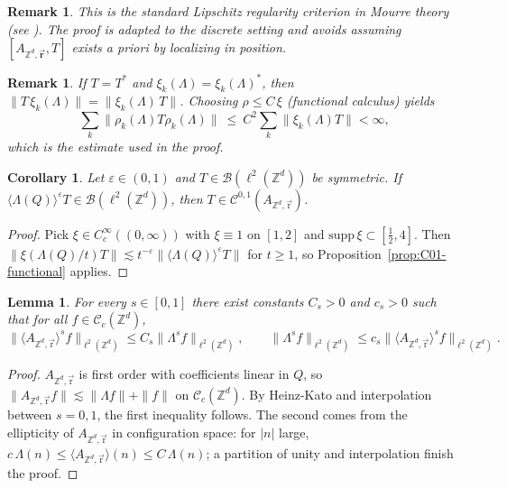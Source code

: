 \documentclass[10pt]{amsart} %
\newcommand{\1}{{\mathbb{I}}}
\numberwithin{equation}{section}
\newtheorem{lemma}[theorem]{Lemma}%
\newtheorem{remark}[theorem]{Remark}%
\newtheorem{corollary}[theorem]{Corollary}%
\begin{document}
\begin{remark}
This is the standard Lipschitz regularity criterion in Mourre theory (see \cite{ABG}). The proof is adapted to the discrete setting and avoids assuming $[A_{\mathbb{Z}^d,\vec{\mathbf{r}}},T]$ exists a priori by localizing in position.
\end{remark}

\begin{remark}
If $T=T^*$ and $\xi_k(\Lambda)=\xi_k(\Lambda)^*$, then $\|T\,\xi_k(\Lambda)\|=\|\xi_k(\Lambda)\,T\|$. Choosing $\rho\le C\,\xi$ (functional calculus) yields
\[
\sum_k\|\rho_k(\Lambda)T\rho_k(\Lambda)\|
\ \le\ C^2\sum_k\|\xi_k(\Lambda)T\|<\infty,
\]
which is the estimate used in the proof.
\end{remark}

\begin{corollary}\label{cor:hypothesis1}
Let $\varepsilon\in(0,1)$ and $T\in\mathcal{B}(\ell^2(\mathbb{Z}^d))$ be symmetric.
If $\langle\Lambda(Q)\rangle^{\varepsilon}T\in\mathcal{B}(\ell^2(\mathbb{Z}^d))$, then $T\in\mathcal{C}^{0,1}(A_{\mathbb{Z}^d,\vec{\mathrm{r}}})$.
\end{corollary}

\begin{proof}
Pick $\xi\in C_c^\infty((0,\infty))$ with $\xi\equiv1$ on $[1,2]$ and $\mathrm{supp}\,\xi\subset[\tfrac12,4]$.
Then $\|\xi(\Lambda(Q)/t)T\|\lesssim t^{-\varepsilon}\|\langle\Lambda(Q)\rangle^{\varepsilon}T\|$ for $t\ge1$, so Proposition~\ref{prop:C01-functional} applies.
\end{proof}
\begin{lemma}\label{lem:interpolation_weights}
For every $s\in[0,1]$ there exist constants $C_s>0$ and $c_s>0$ such that for all $f\in\mathcal{C}_c(\mathbb{Z}^d)$,
\begin{equation}\label{eq:interp}
\|\langle A_{\mathbb{Z}^d,\vec{\mathrm{r}}}\rangle^s f\|_{\ell^2(\mathbb{Z}^d)}\le C_s\|\Lambda^s f\|_{\ell^2(\mathbb{Z}^d)},\qquad
\|\Lambda^s f\|_{\ell^2(\mathbb{Z}^d)}\le c_s\|\langle A_{\mathbb{Z}^d,\vec{\mathrm{r}}}\rangle^s f\|_{\ell^2(\mathbb{Z}^d)}.
\end{equation}
\end{lemma}

\begin{proof}
$A_{\mathbb{Z}^d,\vec{\mathrm{r}}}$ is first order with coefficients linear in $Q$, so
$\|A_{\mathbb{Z}^d,\vec{\mathrm{r}}} f\|\lesssim \|\Lambda f\|+\|f\|$ on $\mathcal{C}_c(\mathbb{Z}^d)$. By Heinz-Kato and interpolation between $s=0,1$, the first inequality follows. The second comes from the ellipticity of $A_{\mathbb{Z}^d,\vec{\mathrm{r}}}$ in configuration space: for $|n|$ large, $c\,\Lambda(n)\le \langle A_{\mathbb{Z}^d,\vec{\mathrm{r}}}\rangle(n)\le C\,\Lambda(n)$; a partition of unity and interpolation finish the proof.
\end{proof}
\end{document}
